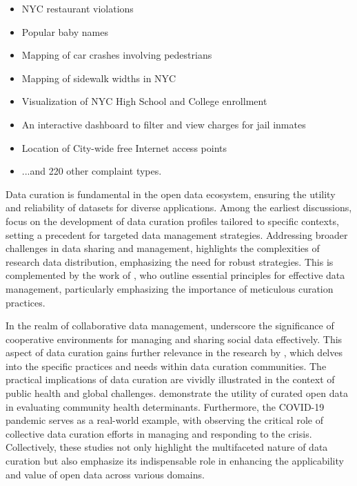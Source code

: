 \documentclass[12pt, titlepage]{article}
\begin{document}
\begin{itemize}
	\item NYC restaurant violations
	\item Popular baby names
	\item Mapping of car crashes involving pedestrians
	\item Mapping of sidewalk widths in NYC 
	\item Visualization of NYC High School and College enrollment
	\item An interactive dashboard to filter and view charges for jail inmates
	\item Location of City-wide free Internet access points
	\item ...and 220 other complaint types. 
\end{itemize}

Data curation is fundamental in the open data ecosystem, ensuring the
utility and reliability of datasets for diverse applications. Among
the earliest discussions, \citet{witt2009constructing} focus on the
development of data curation profiles tailored to specific contexts,
setting a precedent for targeted data management
strategies. Addressing broader challenges in data sharing and
management, \citet{borgman2012conundrum} highlights the complexities
of research data distribution, emphasizing the need for robust
strategies. This is complemented by the work of \citet{hart2016ten},
who outline essential principles for effective data management,
particularly emphasizing the importance of meticulous curation
practices. 

In the realm of collaborative data management,
\citet{beheshti2019datasynapse} underscore the significance of
cooperative environments for managing and sharing social data
effectively. This aspect of data curation gains further relevance in
the research by \citet{mclure2014data}, which delves into the specific
practices and needs within data curation communities. The practical
implications of data curation are vividly illustrated in the context
of public health and global challenges. \citet{cantor2018facets}
demonstrate the utility of curated open data in evaluating community
health determinants. Furthermore, the COVID-19 pandemic serves as a
real-world example, with \citet{shankar2021data} observing the
critical role of collective data curation efforts in managing and
responding to the crisis. Collectively, these studies not only highlight the 
multifaceted nature of data curation but also emphasize
its indispensable role in enhancing the applicability and value of
open data across various domains.
\end{document}
